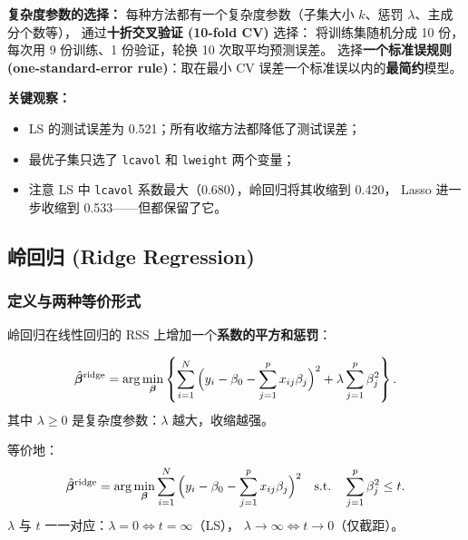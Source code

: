 \textbf{复杂度参数的选择：} 每种方法都有一个复杂度参数（子集大小 $k$、惩罚 $\lambda$、主成分个数等），
通过\textbf{十折交叉验证 (10-fold CV)} 选择：
将训练集随机分成 10 份，每次用 9 份训练、1 份验证，轮换 10 次取平均预测误差。
选择\textbf{一个标准误规则 (one-standard-error rule)}：取在最小 CV 误差一个标准误以内的\textbf{最简约}模型。

\textbf{关键观察：}
\begin{itemize}
    \item LS 的测试误差为 0.521；所有收缩方法都降低了测试误差；
    \item 最优子集只选了 \texttt{lcavol} 和 \texttt{lweight} 两个变量；
    \item 注意 LS 中 \texttt{lcavol} 系数最大（0.680），岭回归将其收缩到 0.420，
    Lasso 进一步收缩到 0.533——但都保留了它。
\end{itemize}

\subsection{岭回归 (Ridge Regression)}

\subsubsection{定义与两种等价形式}

岭回归在线性回归的 RSS 上增加一个\textbf{系数的平方和惩罚}：

\begin{definition}
\begin{equation}\label{eq:ridge_lagrangian}
    \hat{\bm{\beta}}^{\text{ridge}}
    = \arg\min_{\bm{\beta}} \left\{
        \sum_{i=1}^{N} \Big(y_i - \beta_0 - \sum_{j=1}^{p} x_{ij}\beta_j\Big)^2
        + \lambda \sum_{j=1}^{p} \beta_j^2
    \right\}.
\end{equation}
其中 $\lambda \ge 0$ 是复杂度参数：$\lambda$ 越大，收缩越强。
\end{definition}

\begin{definition}
等价地：
\begin{equation}\label{eq:ridge_constrained}
    \hat{\bm{\beta}}^{\text{ridge}}
    = \arg\min_{\bm{\beta}} \sum_{i=1}^{N} \Big(y_i - \beta_0 - \sum_{j=1}^{p} x_{ij}\beta_j\Big)^2
    \quad \text{s.t.} \quad \sum_{j=1}^{p} \beta_j^2 \le t.
\end{equation}
$\lambda$ 与 $t$ 一一对应：$\lambda = 0 \Leftrightarrow t = \infty$（LS），
$\lambda \to \infty \Leftrightarrow t \to 0$（仅截距）。
\end{definition}

